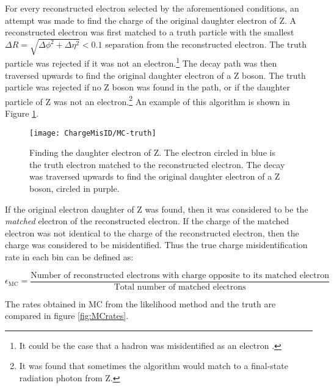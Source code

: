For every reconstructed electron selected by the aforementioned conditions, an attempt was made to find the charge of the original daughter electron of Z. A reconstructed electron was first matched to a truth particle with the smallest $\Delta R = \sqrt{\Delta \phi^2 + \Delta \eta^2} < 0.1$ separation from the reconstructed electron. The truth particle was rejected if it was not an electron.\footnote{It could be the case that a hadron was misidentified as an electron \cite{ElectronReco2011}.} The decay path was then traversed upwards to find the original daughter electron of a Z boson. The truth particle was rejected if no Z boson was found in the path, or if the daughter particle of Z was not an electron.\footnote{It was found that sometimes the algorithm would match to a final-state radiation photon from Z.} An example of this algorithm is shown in Figure \ref{fig:find-daughter-electron}.

\begin{figure}[h!]
\centering
\texttt{[image: ChargeMisID/MC-truth]}
\caption[Finding the original daughter electron of Z]{Finding the  daughter electron of Z. The electron circled in blue is the truth electron matched to the reconstructed electron. The decay was traversed upwards to find the original daughter electron of a Z boson, circled in purple.}
\label{fig:find-daughter-electron}
\end{figure}

If the original electron daughter of Z was found, then it was considered to be the \textit{matched} electron of the reconstructed electron. If the charge of the matched electron was not identical to the charge of the reconstructed electron, then the charge was considered to be misidentified. Thus the true charge misidentification rate in each bin can be defined as:

\begin{equation}
\epsilon_{\text{MC}} = \frac{\text{Number of reconstructed electrons with charge opposite to its matched electron}}{\text{Total number of matched electrons}}
\end{equation}

The rates obtained in MC from the likelihood method and the truth are compared in figure \ref{fig:MCrates}.

\begin{figure}[h]
\centering
{}


\end{figure}

